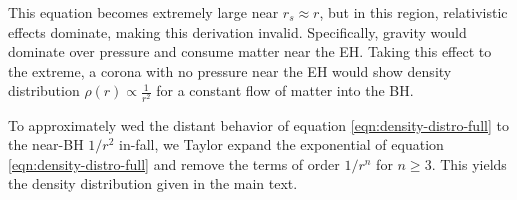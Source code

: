 \documentclass[twocolumn,twocolappendix]{aastex631}
\newcommand{\parens}[1]{\left(#1\right)}
\begin{document}
This equation becomes extremely large near $r_s \approx r$, but in this region, relativistic effects dominate, making this derivation invalid. Specifically, gravity would dominate over pressure and consume matter near the EH. Taking this effect to the extreme, a corona with no pressure near the EH would show density distribution $\rho(r) \propto \frac{1}{r^2}$ for a constant flow of matter into the BH.

To approximately wed the distant behavior of equation \ref{eqn:density-distro-full} to the near-BH $1/r^2$ in-fall, we Taylor expand the exponential of equation \ref{eqn:density-distro-full} and remove the terms of order $1/r^n$ for $n\geq 3$. This yields the density distribution given in the main text.


\end{document}
